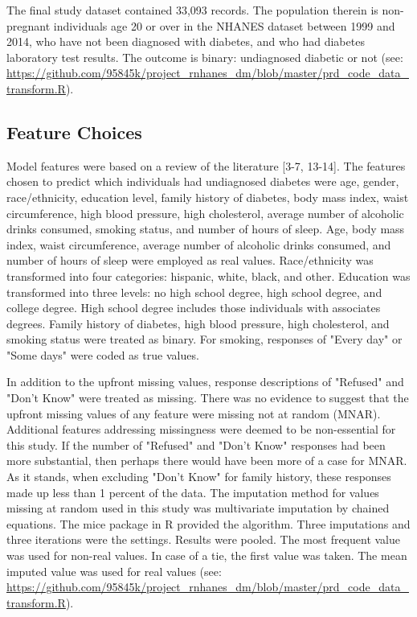 \documentclass[twoside,11pt]{article}
\begin{document}
The final study dataset contained 33,093 records. The population therein is non-pregnant individuals age 20 or over in the NHANES dataset between 1999 and 2014, who have not been diagnosed with diabetes, and who had diabetes laboratory test results. The outcome is binary: undiagnosed diabetic or not (see: \url{https://github.com/95845k/project_rnhanes_dm/blob/master/prd_code_data_transform.R}).

\subsection{Feature Choices} 
Model features were based on a review of the literature [3-7, 13-14]. The features chosen to predict which individuals had undiagnosed diabetes were age, gender, race/ethnicity, education level, family history of diabetes, body mass index, waist circumference, high blood pressure, high cholesterol, average number of alcoholic drinks consumed, smoking status, and number of hours of sleep. Age, body mass index, waist circumference, average number of alcoholic drinks consumed, and number of hours of sleep were employed as real values. Race/ethnicity was transformed into four categories: hispanic, white, black, and other. Education was transformed into three levels: no high school degree, high school degree, and college degree. High school degree includes those individuals with associates degrees. Family history of diabetes, high blood pressure, high cholesterol, and smoking status were treated as binary. For smoking, responses of "Every day" or "Some days" were coded as true values. 

In addition to the upfront missing values, response descriptions of "Refused" and "Don't Know" were treated as missing. There was no evidence to suggest that the upfront missing values of any feature were missing not at random (MNAR). Additional features addressing missingness were deemed to be non-essential for this study. If the number of "Refused" and "Don't Know" responses had been more substantial, then perhaps there would have been more of a case for MNAR. As it stands, when excluding "Don't Know" for family history, these responses made up less than 1 percent of the data. The imputation method for values missing at random used in this study was multivariate imputation by chained equations. The mice package in R provided the algorithm. Three imputations and three iterations were the settings. Results were pooled. The most frequent value was used for non-real values. In case of a tie, the first value was taken. The mean imputed value was used for real values (see: \url{https://github.com/95845k/project_rnhanes_dm/blob/master/prd_code_data_transform.R}).
\end{document}
